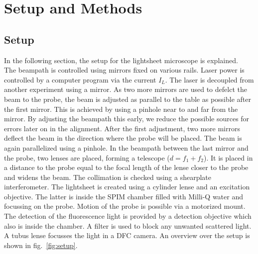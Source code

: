 

\def\skalierung{0.65}

\chapter{Setup and Methods}
\label{chap:methods}
\section{Setup}\label{sec:setup}
In the following section, the setup for the lightsheet microscope is explained. \\
The beampath is controlled using mirrors fixed on various rails. Laser power is controlled by a computer program via the current $I_L$. The laser is decoupled from another experiment using a mirror. As two more mirrors are used to defelct the beam to the probe, the beam is adjusted as parallel to the table as possible after the first mirror. This is achieved by using a pinhole near to and far from the mirror. By adjusting the beampath this early, we reduce the possible sources for errors later on in the alignment. After the first adjustment, two more mirrors deflect the beam in the direction where the probe will be placed. The beam is again parallelized using a pinhole. In the beampath between the last mirror and the probe, two lenses are placed, forming a telescope ($d = f_1 + f_2$). It is placed in a distance to the probe equal to the focal length of the lense closer to the probe and widens the beam. The collimation is checked using a shearplate interferometer. The lightsheet is created using a cylinder lense and an excitation objective. The latter is inside the SPIM chamber filled with Milli-Q water and focussing on the probe. Motion of the probe is possible via a motorized mount. The detection of the fluorescence light is provided by a detection objective which also is inside the chamber. A filter is used to block any unwanted scattered light. A tubus lense focusses the light in a DFC camera. An overview over the setup is shown in fig.~\ref{fig:setup}.

